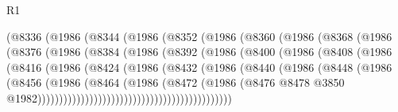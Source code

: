 \begin{lexlean}{R1}
\begin{coremodule}
                    (@8336
                      (@1986
                        (@8344
                          (@1986
                            (@8352
                              (@1986
                                (@8360
                                  (@1986
                                    (@8368
                                      (@1986
                                        (@8376
                                          (@1986
                                            (@8384
                                              (@1986
                                                (@8392
                                                  (@1986
                                                    (@8400
                                                      (@1986
                                                        (@8408
                                                          (@1986
                                                            (@8416
                                                              (@1986
                                                                (@8424
                                                                  (@1986
                                                                    (@8432
                                                                      (@1986
                                                                        (@8440
                                                                          (@1986
                                                                            (@8448
                                                                              (@1986
                                                                                (@8456
                                                                                  (@1986
                                                                                    (@8464
                                                                                      (@1986
                                                                                        (@8472
                                                                                          (@1986
                                                                                            (@8476
                                                                                              @8478
                                                                                              @3850
                                                                                              @1982)))))))))))))))))))))))))))))))))))))))))))))

\end{coremodule}
\end{lexlean}

